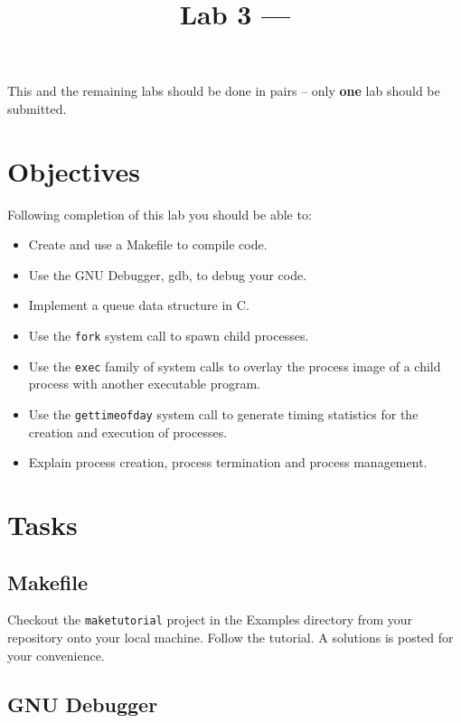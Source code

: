 \documentclass[12pt]{article}
\title{Lab 3 --- \labtitlethree}
\begin{document}
\maketitle

This and the remaining labs should be done in pairs -- only
\textbf{one} lab should be submitted.


\section{Objectives}

Following completion of this lab you should be able to:
\latex{\vspace*{-\topsep}\vspace*{-\partopsep}}
\begin{itemize}{}
  \latex{\setlength{\itemsep}{0in}}
  \item Create and use a Makefile to compile code.  
  \item Use the GNU Debugger, gdb, to debug your code.
  \item Implement a queue data structure in C.
  \item Use the \texttt{fork} system call to spawn child processes.
  \item Use the \texttt{exec} family of system calls to overlay the
  process image of a child process with another executable program.
  \item Use the \texttt{gettimeofday} system call to generate timing
  statistics for the creation and execution of processes.
  \item Explain process creation, process termination and process
  management.
\end{itemize}

\section{Tasks}

\subsection{Makefile}

Checkout the \texttt{maketutorial} project in the Examples directory
from your repository onto your local machine. Follow the tutorial.  A
solutions is posted for your convenience.

\subsection{GNU Debugger}
\end{document}
